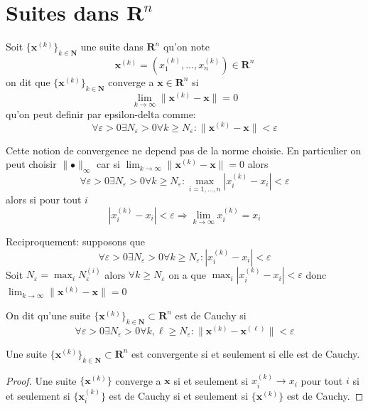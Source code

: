 \section{Suites dans \texorpdfstring{$\mathbf{R}^{n}$}{Rn}}
\begin{definition}
Soit $\{ \boldsymbol{x}^{(k)} \}_{k\in \mathbf{N}}$ une suite dans $\mathbf{R}^{n}$ qu'on note
$$
\boldsymbol{x}^{(k)}=(x_{1}^{(k)},\dots,x_{n}^{(k)})\in \mathbf{R}^{n}
$$
on dit que $\{ \boldsymbol{x}^{(k)} \}_{k\in \mathbf{N}}$ converge a $\boldsymbol{x}\in \mathbf{R}^{n}$ si
$$
\lim_{ k \to \infty } \lVert \boldsymbol{x}^{(k)}-\boldsymbol{x} \rVert=0
$$
qu'on peut definir par epsilon-delta comme:
$$
\forall\varepsilon>0\exists N_{\varepsilon}>0\forall k\ge N_{\varepsilon}:\lVert \boldsymbol{x}^{(k)}-\boldsymbol{x} \rVert <{\varepsilon}
$$
\end{definition}
\begin{remark}
Cette notion de convergence ne depend pas de la norme choisie. En particulier on peut choisir $\lVert \bullet \rVert_{\infty}$ car si $\lim_{ k \to \infty }\lVert \boldsymbol{x}^{(k)}-\boldsymbol{x} \rVert=0$ alors
$$
\forall\varepsilon>0\exists N_{\varepsilon}>0\forall k\geq N_{\varepsilon}:\max_{i=1,\dots,n}|x^{(k)}_{i}-x_{i}|<\varepsilon
$$
alors si pour tout $i$
$$ 
|x^{(k)}_{i}-x_{i}|<\varepsilon \Rightarrow \lim_{ k \to \infty }x^{(k)}_{i}=x_{i}
$$

Reciproquement: supposons que 
$$
\forall\varepsilon>0\exists N_{\varepsilon}>0\forall k\ge N_{\varepsilon}:|x_{i}^{(k)}-x_{i}|<\varepsilon
$$
Soit $N_{\varepsilon}=\max_{i}N_{\varepsilon}^{(i)}$ alors $\forall k\ge N_{\varepsilon}$ on a que $\max_{i}|x^{(k)}_{i}-x_{i}|<\varepsilon$ donc $\lim_{ k \to \infty }\lVert \boldsymbol{x}^{(k)}-\boldsymbol{x} \rVert=0$
\end{remark}
\begin{definition}
On dit qu'une suite $\{ \boldsymbol{x}^{(k)} \}_{k\in \mathbf{N}}\subset \mathbf{R}^{n}$ est de Cauchy si 
$$
\forall\varepsilon>0\exists N_{\varepsilon}>0\forall k,\ell\geq N_{\varepsilon}:\lVert \boldsymbol{x}^{(k)}-\boldsymbol{x}^{(\ell)} \rVert <\varepsilon
$$
\end{definition}
\begin{theorem}
Une suite $\{ \boldsymbol{x}^{(k)} \}_{k\in \mathbf{N}}\subset \mathbf{R}^{n}$ est convergente si et seulement si elle est de Cauchy.
\end{theorem}
\begin{proof}
Une suite $\{ \boldsymbol{x}^{(k)} \}$ converge a $\boldsymbol{x}$ si et seulement si $x_{i}^{(k)}\to x_{i}$ pour tout $i$ si et seulement si $\{ \boldsymbol{x}_{i}^{(k)} \}$ est de Cauchy si et seulement si $\{ \boldsymbol{x}^{(k)} \}$ est de Cauchy.
\end{proof}
